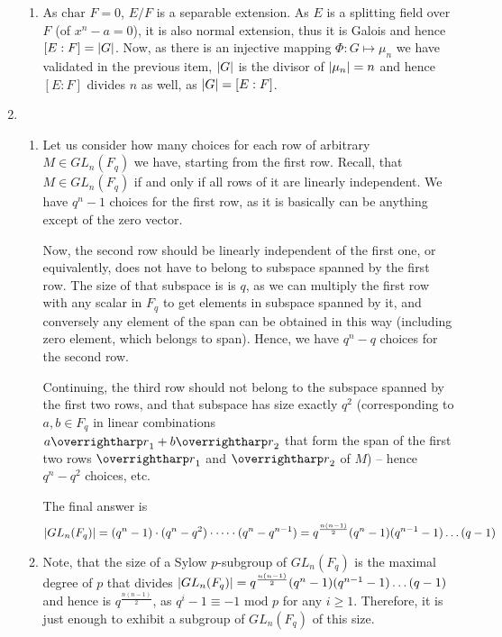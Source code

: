 \documentclass[8pt]{article} %
\begin{document}
\begin{enumerate}[label=\bfseries Problem \arabic*.]
{\begin{enumerate}[label=(\arabic*).]
{				Now, if $\Phi(\sigma)=\sigma(\alpha)/\alpha=1$
				for $\sigma\in Gal(E/F)$, this means that $\forall\alpha,\;\alpha^n=a\implies\sigma(\alpha)=\alpha$, thus $\sigma$ fixes
				zeros of $x^n-a=0$. As splitting field $E$ is generated by zeros of $x^n-a$, the fact that $\sigma$ fixes these zeros as well as $F$
				implies that $\sigma$ fixes $E$, that is $\sigma=id_E$ and this shows injectiveness.
				}
			\item{As $\mbox{char }F=0$, $E/F$ is a separable extension. As $E$ is a splitting field over $F$ (of $x^n-a=0$), it is also normal extension,
				thus it is Galois and hence $[E:F]=\left|G\right|$. Now, as there is an injective mapping $\Phi:G\mapsto \mu_n$ we have validated
				in the previous item, $\left|G\right|$ is the divisor of $\left|\mu_n\right|=n$ and hence $[E:F]$ divides $n$ as well, as $\left|G\right|=[E:F]$.
				}
		\end{enumerate}
		}
	\item{
		\begin{enumerate}[label=(\arabic*).]
			\newcommand{\M}{GL_n(F_q)}
			\item{Let us consider how many choices for each row of arbitrary $M\in GL_n(F_q)$ we have, starting from the first row. Recall, that $M\in
				GL_n(F_q)$ if and only if all rows of it are linearly independent. We have $q^n-1$ choices for the first row, as it is basically
				can be anything except of the zero vector. 
				
				Now, the second row should be linearly independent of the first one, or equivalently,
				does not have to belong to subspace spanned by the first row. The size of that subspace is is $q$, as we can multiply
				the first row with any scalar in $F_q$ to get elements in subspace spanned by it, and conversely any element of the span can be obtained
				in this way (including zero element, which belongs to span). Hence, we have $q^n-q$ choices for the second row.

				Continuing, the third row should not belong to the subspace spanned by the first two rows, and that subspace has size exactly
				$q^2$ (corresponding to $a,b\in F_q$ in linear combinations $a\myvec{r}_1+b\myvec{r}_2$ that form the span of the first two rows
				$\myvec{r}_1$ and $\myvec{r}_2$ of $M$) -- hence $q^n-q^2$ choices, etc.

				The final answer is
				\[\left|GL_n(F_q)\right|=(q^n-1)\cdot(q^n-q^2)\cdot\dots\cdot(q^n-q^{n-1})=q^{\frac{n(n-1)}{2}}(q^n-1)(q^{n-1}-1)\dots(q-1)\]
				}
			\item{Note, that the size of a Sylow $p$-subgroup of $\M$ is the maximal degree of $p$ that divides $\myabs{\M}=q^{\frac{n(n-1)}{2}}(q^n-1)(q^{n-1}-1)\dots(q-1)$
				and hence is $q^{\frac{n(n-1)}{2}}$, as $q^i-1\equiv -1\mbox{ mod }p$ for any $i\geq 1$. Therefore, it is just enough
				to exhibit a subgroup of $\M$ of this size.

}
\end{enumerate}}
\end{enumerate}
\end{document}
